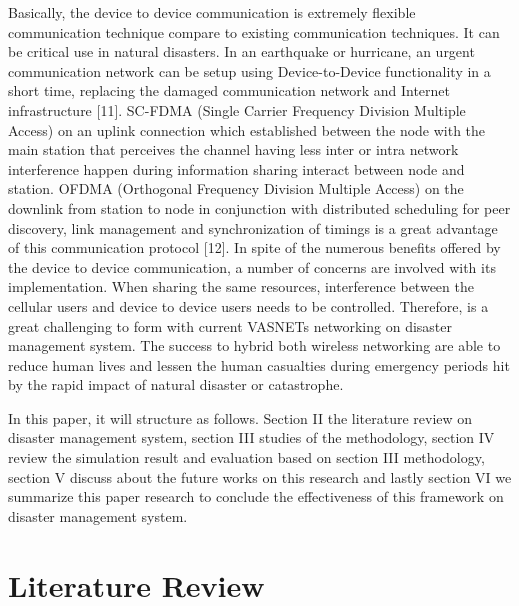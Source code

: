 \documentclass{article}
\begin{document}
Basically, the device to device communication is extremely flexible communication technique compare to existing communication techniques. It can be critical use in natural disasters. In an earthquake or hurricane, an urgent communication network can be setup using Device-to-Device functionality in a short time, replacing the damaged communication network and Internet infrastructure [11]. SC-FDMA (Single Carrier Frequency Division Multiple Access) on an uplink connection which established between the node with the main station that perceives the channel having less inter or intra network interference happen during information sharing interact between node and station. OFDMA (Orthogonal Frequency Division Multiple Access) on the downlink from station to node in conjunction with distributed scheduling for peer discovery, link management and synchronization of timings is a great advantage of this communication protocol [12]. In spite of the numerous benefits offered by the device to device communication, a number of concerns are involved with its implementation. When sharing the same resources, interference between the cellular users and device to device users needs to be controlled. Therefore, is a great challenging to form with current VASNETs networking on disaster management system. The success to hybrid both wireless networking are able to reduce human lives and lessen the human casualties during emergency periods hit by the rapid impact of natural disaster or catastrophe. 

In this paper, it will structure as follows. Section II the literature review on disaster management system, section III studies of the methodology, section IV review the simulation result and evaluation based on section III methodology, section V discuss about the future works on this research and lastly section VI we summarize this paper research to conclude the effectiveness of this framework on disaster management system.   

\section{Literature Review}
\end{document}
